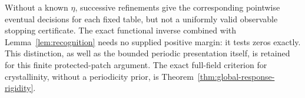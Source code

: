 Without a known $\eta$, successive refinements give the corresponding
pointwise eventual decisions for each fixed table, but not a uniformly
valid observable stopping certificate. The exact functional inverse
combined with Lemma~\ref{lem:recognition} needs no supplied positive
margin: it tests zeros exactly. This distinction, as well as the
bounded periodic presentation itself, is retained for this finite
protected-patch argument. The exact full-field criterion for
crystallinity, without a periodicity prior, is
Theorem~\ref{thm:global-response-rigidity}.
